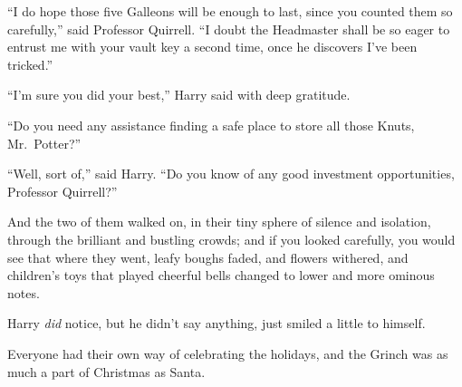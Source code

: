 “I do hope those five Galleons will be enough to last, since you counted them so carefully,” said Professor Quirrell. “I doubt the Headmaster shall be so eager to entrust me with your vault key a second time, once he discovers I’ve been tricked.”

“I’m sure you did your best,” Harry said with deep gratitude.

“Do you need any assistance finding a safe place to store all those Knuts, Mr.~Potter?”

“Well, sort of,” said Harry. “Do you know of any good investment opportunities, Professor Quirrell?”

And the two of them walked on, in their tiny sphere of silence and isolation, through the brilliant and bustling crowds; and if you looked carefully, you would see that where they went, leafy boughs faded, and flowers withered, and children’s toys that played cheerful bells changed to lower and more ominous notes.

Harry \emph{did} notice, but he didn’t say anything, just smiled a little to himself.

Everyone had their own way of celebrating the holidays, and the Grinch was as much a part of Christmas as Santa.
